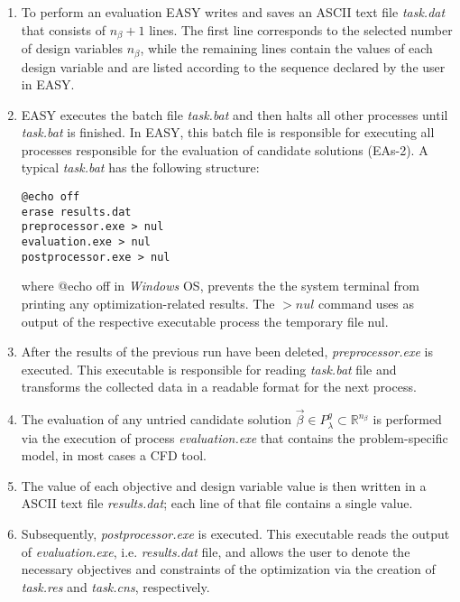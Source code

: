 \begin{enumerate}
\item To perform an evaluation EASY writes and saves an 
ASCII text file \textit{task.dat} that consists of $n_{β}+1$ 
lines. The first line corresponds to the selected number of 
design variables $n_{β}$, while the remaining lines contain 
the values of each design variable and are listed according 
to the sequence declared by the user in EASY.  

\item EASY executes the batch file \textit{task.bat} and then
halts all other processes until \textit{task.bat} is 
finished. In EASY, this batch file is responsible for 
executing all processes responsible for the evaluation of 
candidate solutions (EAs-2). A typical \textit{task.bat} has the 
following structure:

\begin{lstlisting}[language = command.com, caption = Structure of 
\textit{task.bat} file]
@echo off
erase results.dat
preprocessor.exe > nul 
evaluation.exe > nul 
postprocessor.exe > nul
\end{lstlisting}

where @echo off in \textit{Windows} OS, prevents the 
the system terminal from printing any optimization-related 
results. The $> nul$ command uses as output of the respective 
executable process the temporary file nul. 

\item After the results of the previous run have been deleted, 
\textit{preprocessor.exe} is executed. This executable is 
responsible for reading \textit{task.bat} file and transforms
the collected data in a readable format for the next process.

\newpage


\item The evaluation of any untried candidate solution $\vec{β} 
\!\in \!P_{λ}^{g} \!\subset \!\mathbb{R}^{n_{β}}$ is performed 
via the execution of process \textit{evaluation.exe} that contains 
the problem-specific model, in most cases a CFD tool.

\item The value of each objective and design variable value is 
then written in a ASCII text file \textit{results.dat}; each line
of that file contains a single value.

\item Subsequently, \textit{postprocessor.exe} is executed. 
This executable reads the output of \textit{evaluation.exe}, 
i.e. \textit{results.dat} file, and allows the user to denote 
the necessary objectives and constraints of the optimization via 
the creation of \textit{task.res} and \textit{task.cns}, 
respectively.


\end{enumerate}
